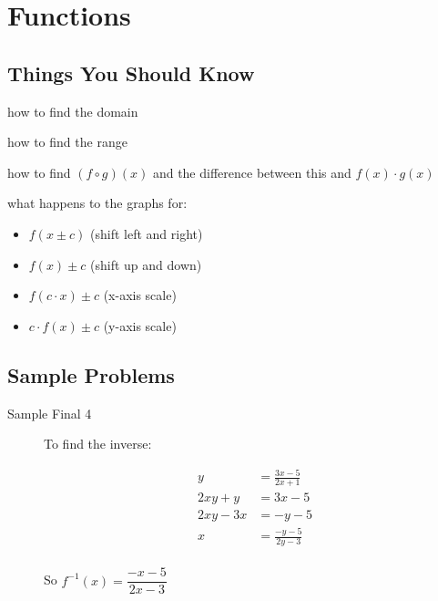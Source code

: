 \documentclass[fleqn,addpoints]{exam}
\begin{document}
\section{Functions}

\subsection{Things You Should Know}
\begin{itemize*}
\item how to find the domain
\item how to find the range
\item how to find $(f \circ g)(x)$ and the difference between this and $f(x) \cdot g(x)$
\item what happens to the graphs for:
\begin{itemize}
  \item $f(x \pm c)$ (shift left and right)
  \item $f(x) \pm c$ (shift up and down)
  \item $f(c \cdot x) \pm c$ (x-axis scale)
  \item $c \cdot f(x) \pm c$ (y-axis scale)
\end{itemize}

\end{itemize*}

\subsection{Sample Problems}
\begin{description}

\item[Sample Final 4]

To find the inverse:

\begin{align*}
  y &= \frac{3x-5}{2x+1} \\
  2xy + y &= 3x - 5 \\
  2xy - 3x &= -y - 5 \\
  x &= \frac{-y-5}{2y-3} \\
\end{align*}

So $f^{-1}(x) = \dfrac{-x-5}{2x-3}$

\end{description}
\end{document}
